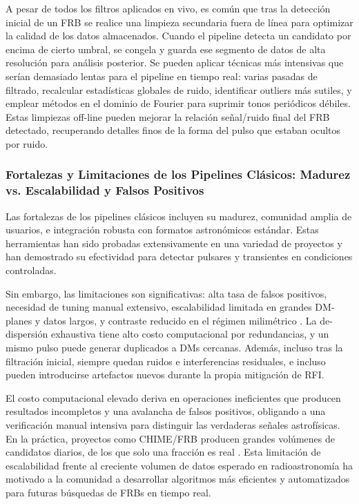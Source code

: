 A pesar de todos los filtros aplicados en vivo, es común que tras la detección inicial de un FRB se realice una limpieza secundaria fuera de línea para optimizar la calidad de los datos almacenados. Cuando el pipeline detecta un candidato por encima de cierto umbral, se congela y guarda ese segmento de datos de alta resolución para análisis posterior. Se pueden aplicar técnicas más intensivas que serían demasiado lentas para el pipeline en tiempo real: varias pasadas de filtrado, recalcular estadísticas globales de ruido, identificar outliers más sutiles, y emplear métodos en el dominio de Fourier para suprimir tonos periódicos débiles. Estas limpiezas off-line pueden mejorar la relación señal/ruido final del FRB detectado, recuperando detalles finos de la forma del pulso que estaban ocultos por ruido.

\subsubsection{Fortalezas y Limitaciones de los Pipelines Clásicos: Madurez vs. Escalabilidad y Falsos Positivos}

Las fortalezas de los pipelines clásicos incluyen su madurez, comunidad amplia de usuarios, e integración robusta con formatos astronómicos estándar. Estas herramientas han sido probadas extensivamente en una variedad de proyectos y han demostrado su efectividad para detectar pulsares y transientes en condiciones controladas.

Sin embargo, las limitaciones son significativas: alta tasa de falsos positivos, necesidad de tuning manual extensivo, escalabilidad limitada en grandes DM-planes y datos largos, y contraste reducido en el régimen milimétrico \citep{Barsdell_2012}. La de-dispersión exhaustiva tiene alto costo computacional por redundancias, y un mismo pulso puede generar duplicados a DMs cercanas. Además, incluso tras la filtración inicial, siempre quedan ruidos e interferencias residuales, e incluso pueden introducirse artefactos nuevos durante la propia mitigación de RFI. 

El costo computacional elevado deriva en operaciones ineficientes que producen resultados incompletos y una avalancha de falsos positivos, obligando a una verificación manual intensiva para distinguir las verdaderas señales astrofísicas. En la práctica, proyectos como CHIME/FRB producen grandes volúmenes de candidatos diarios, de los que solo una fracción es real \citep{CHIME2021}. Esta limitación de escalabilidad frente al creciente volumen de datos esperado en radioastronomía ha motivado a la comunidad a desarrollar algoritmos más eficientes y automatizados para futuras búsquedas de FRBs en tiempo real.

